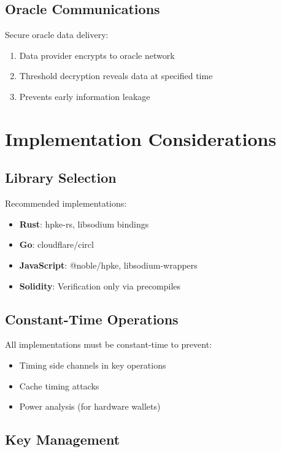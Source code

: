 \documentclass[11pt,a4paper]{article}
\begin{document}
\subsection{Oracle Communications}

Secure oracle data delivery:
\begin{enumerate}
    \item Data provider encrypts to oracle network
    \item Threshold decryption reveals data at specified time
    \item Prevents early information leakage
\end{enumerate}

\section{Implementation Considerations}

\subsection{Library Selection}

Recommended implementations:
\begin{itemize}
    \item \textbf{Rust}: hpke-rs, libsodium bindings
    \item \textbf{Go}: cloudflare/circl
    \item \textbf{JavaScript}: @noble/hpke, libsodium-wrappers
    \item \textbf{Solidity}: Verification only via precompiles
\end{itemize}

\subsection{Constant-Time Operations}

All implementations must be constant-time to prevent:
\begin{itemize}
    \item Timing side channels in key operations
    \item Cache timing attacks
    \item Power analysis (for hardware wallets)
\end{itemize}

\subsection{Key Management}
\end{document}
